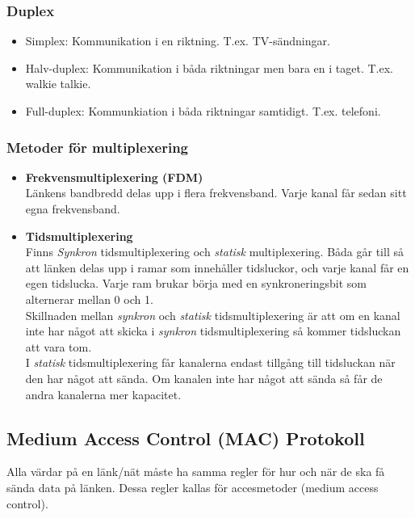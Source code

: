 \documentclass[11pt]{article}
\begin{document}
\subsubsection*{Duplex}
\begin{itemize}
\item{Simplex: Kommunikation i en riktning. T.ex. TV-sändningar.}
\item{Halv-duplex: Kommunikation i båda riktningar men bara en i taget. T.ex. walkie talkie.}
\item{Full-duplex: Kommunkiation i båda riktningar samtidigt. T.ex. telefoni.}
\end{itemize}

\subsubsection{Metoder för multiplexering}

\begin{itemize}
\item{\textbf{Frekvensmultiplexering (FDM)} \\
	Länkens bandbredd delas upp i flera frekvensband. Varje kanal får sedan sitt egna frekvensband.}
\item{\textbf{Tidsmultiplexering} \\
	Finns \emph{Synkron} tidsmultiplexering och \emph{statisk} multiplexering. Båda går till så att länken delas upp i ramar som innehåller tidsluckor, och varje kanal får en egen tidslucka. Varje ram brukar börja med en synkroneringsbit som alternerar mellan 0 och 1. \\
	Skillnaden mellan \emph{synkron} och \emph{statisk} tidsmultiplexering är att om en kanal inte har något att skicka i \emph{synkron} tidsmultiplexering så kommer tidsluckan att vara tom. \\
	I \emph{statisk} tidsmultiplexering får kanalerna endast tillgång till tidsluckan när den har något att sända. Om kanalen inte har något att sända så får de andra kanalerna mer kapacitet.}
\end{itemize}
\subsection{Medium Access Control (MAC) Protokoll}
Alla värdar på en länk/nät måste ha samma regler för hur och när de ska få sända data på länken. Dessa regler kallas för accesmetoder (medium access control).
\end{document}

